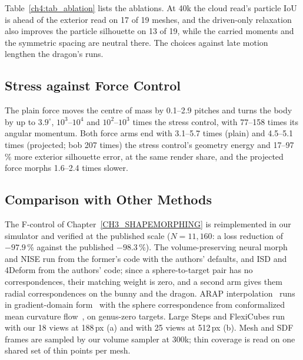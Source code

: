 Table~\ref{ch4:tab_ablation} lists the ablations. At 40k the cloud read's particle IoU is ahead of the exterior read on 17 of 19
meshes, and the driven-only relaxation also improves the particle silhouette on 13 of 19, while the carried moments and the
symmetric spacing are neutral there. The choices against late motion lengthen the dragon's runs.

\subsection{Stress against Force Control}
The plain force moves the centre of mass by 0.1--2.9 pitches and turns the body by up to $3.9^\circ$, $10^3$--$10^4$ and
$10^2$--$10^3$ times the stress control, with 77--158 times its angular momentum. Both force arms end with 3.1--5.7 times
(plain) and 4.5--5.1 times (projected; bob 207 times) the stress control's geometry energy and 17--97\,\% more exterior
silhouette error, at the same render share, and the projected force morphs 1.6--2.4 times slower.

\subsection{Comparison with Other Methods}
\label{app:ch4_comparison}
The F-control of Chapter~\ref{CH3_SHAPEMORPHING} is reimplemented in our simulator and verified at the published scale
($N=11{,}160$: a loss reduction of $-97.9$\,\% against the published $-98.3$\,\%). The volume-preserving neural morph and NISE
run from the former's code with the authors' defaults, and ISD and 4Deform from the authors' code; since a sphere-to-target
pair has no correspondences, their matching weight is zero, and a second arm gives them radial correspondences on the bunny and
the dragon. ARAP interpolation~\citep{2000-ARAPShapeInterpolation} runs in gradient-domain form~\citep{sumner2004deftransfer,2005-PoissonShapeInterpolation} with
the sphere correspondence from conformalized mean curvature flow~\citep{kazhdan2012cmcf}, on genus-zero targets. Large Steps and
FlexiCubes run with our 18 views at 188\,px (a) and with 25 views at 512\,px (b). Mesh and SDF frames are sampled by our volume
sampler at 300k; thin coverage is read on one shared set of thin points per mesh.

